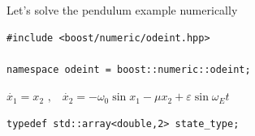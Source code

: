 \begin{frame}[fragile]
\begin{columns}[T]
\begin{column}{0.65\textwidth}
   
  \end{column}
\end{columns}

 

\end{frame}







\begin{frame}[fragile]

\centerline{ \Large Let's solve the pendulum example numerically}

\vspace{2ex}
\begin{lstlisting}
#include <boost/numeric/odeint.hpp>

namespace odeint = boost::numeric::odeint;
\end{lstlisting}

\vspace{2ex}

\centerline{$\dot{x_1} = x_2 \,\,\text{,} \quad \dot{x_2} = - \omega_0 \sin x_1 - \mu x_2 + \varepsilon \sin \omega_E t$}

\vspace{2ex}
\begin{lstlisting}
typedef std::array<double,2> state_type;
\end{lstlisting}

\end{frame}

